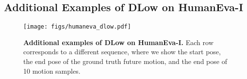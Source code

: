 \documentclass[runningheads]{llncs}
\begin{document}
\clearpage
\subsection{Additional Examples of DLow on HumanEva-I}
\begin{figure}[ht!]
    \centering
    \texttt{[image: figs/humaneva\_dlow.pdf]}
    \caption{\textbf{Additional examples of DLow on HumanEva-I.} Each row corresponds to a different sequence, where we show the start pose, the end pose of the ground truth future motion, and the end pose of 10 motion samples.}
    \label{fig:supp_heva}
\end{figure}

 	
\end{document}
